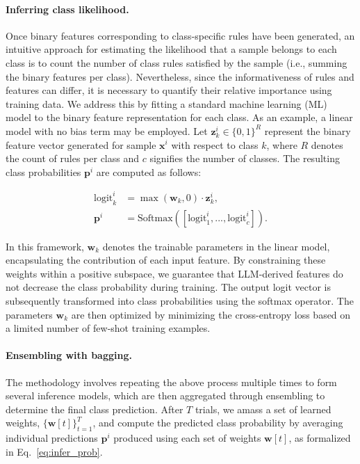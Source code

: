 \paragraph{Inferring class likelihood.} Once binary features corresponding to class-specific rules have been generated, an intuitive approach for estimating the likelihood that a sample belongs to each class is to count the number of class rules satisfied by the sample (i.e., summing the binary features per class). Nevertheless, since the informativeness of rules and features can differ, it is necessary to quantify their relative importance using training data. We address this by fitting a standard machine learning (ML) model to the binary feature representation for each class. As an example, a linear model with no bias term may be employed. Let $\mathbf{z}_k^i \in \{0, 1\}^R$ represent the binary feature vector generated for sample $\mathbf{x}^i$ with respect to class $k$, where $R$ denotes the count of rules per class and $c$ signifies the number of classes. The resulting class probabilities $\mathbf{p}^i$ are computed as follows:

\begin{align}
\text{logit}_k^i &= \max(\mathbf{w}_k, 0) \cdot \mathbf{z}_k^i, \nonumber \\
\mathbf{p}^i &= \text{Softmax}({[\text{logit}_{1}^i, ..., \text{logit}_{c}^i]}). \label{eq:infer_prob}
\end{align}

In this framework, $\mathbf{w}_k$ denotes the trainable parameters in the linear model, encapsulating the contribution of each input feature. By constraining these weights within a positive subspace, we guarantee that LLM-derived features do not decrease the class probability during training. The output logit vector is subsequently transformed into class probabilities using the softmax operator. The parameters $\mathbf{w}_k$ are then optimized by minimizing the cross-entropy loss based on a limited number of few-shot training examples.

\vspace*{-0.12in}
\paragraph{Ensembling with bagging.} The methodology involves repeating the above process multiple times to form several inference models, which are then aggregated through ensembling to determine the final class prediction. After $T$ trials, we amass a set of learned weights, $\{\mathbf{w}[t]\}_{t=1}^T$, and compute the predicted class probability by averaging individual predictions $\mathbf{p}^i$ produced using each set of weights $\mathbf{w}[t]$, as formalized in Eq.~\ref{eq:infer_prob}.

